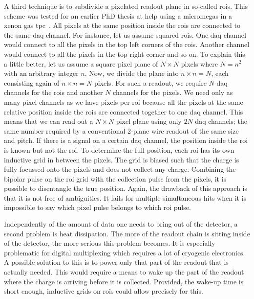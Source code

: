 A third technique is to subdivide a pixelated readout plane in so-called \glspl{roi}.
This scheme was tested for an earlier PhD thesis at \gls{help} using a \gls{micromegas} in a xenon gas \gls{tpc}~\cite{maplesyrup}.
All pixels at the same position inside the \glspl{roi} are connected to the same \gls{daq} channel.
For instance, let us assume squared \glspl{roi}.
One \gls{daq} channel would connect to all the pixels in the top left corners of the \glspl{roi}.
Another channel would connect to all the pixels in the top right corner and so on.
To explain this a little better, let us assume a square pixel plane of $N \times N$ pixels where $N = n ^ 2$ with an arbitrary integer $n$.
Now, we divide the plane into $n \times n = N$, each consisting again of $n \times n = N$ pixels.
For such a readout, we require $N$ \gls{daq} channels for the \glspl{roi} and another $N$ channels for the pixels.
We need only as many pixel channels as we have pixels per \gls{roi} because all the pixels at the same relative position inside the \glspl{roi} are connected together to one \gls{daq} channel.
This means that we can read out a $N \times N$ pixel plane using only $2 N$ \gls{daq} channels; the same number required by a conventional 2-plane wire readout of the same size and pitch.
If there is a signal on a certain \gls{daq} channel, the position inside the \gls{roi} is known but not the \gls{roi}.
To determine the full position, each \gls{roi} has its own inductive grid in between the pixels.
The grid is biased such that the charge is fully focussed onto the pixels and does not collect any charge.
Combining the bipolar pulse on the \gls{roi} grid with the collection pulse from the pixels, it is possible to disentangle the true position.
Again, the drawback of this approach is that it is not free of ambiguities.
It fails for multiple simultaneous hits when it is impossible to say which pixel pulse belongs to which \gls{roi} pulse.

Independently of the amount of data one needs to bring out of the detector, a second problem is heat dissipation.
The more of the readout chain is sitting inside of the detector, the more serious this problem becomes.
It is especially problematic for digital multiplexing which requires a lot of cryogenic electronics.
A possible solution to this is to power only that part of the readout that is actually needed.
This would require a means to wake up the part of the readout where the charge is arriving before it is collected.
Provided, the wake-up time is short enough, inductive grids on \glspl{roi} could allow precisely for this.


